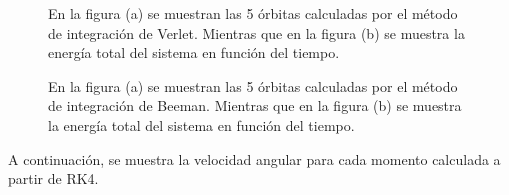 \documentclass[letterpaper,oneside]{article}
\begin{document}
\begin{figure}
    \centering
    \hfill
{}\hfill
\caption{En la figura (a) se muestran las 5 órbitas calculadas por el método de integración de Verlet. Mientras que en la figura (b) se muestra la energía total del sistema en función del tiempo. }
    \label{Verlet}
\end{figure}
\begin{figure}
    \centering
    \hfill
{}\par
    \caption{En la figura (a) se muestran las 5 órbitas calculadas por el método de integración de Beeman. Mientras que en la figura (b) se muestra la energía total del sistema en función del tiempo.}
    \label{Beeman}
\end{figure}
A continuación, se muestra la velocidad angular para cada momento calculada a partir de RK4.
\end{document}
